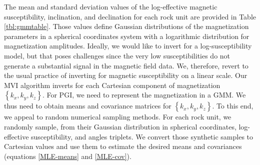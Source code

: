 \documentclass[paper, twocolumn]{geophysics} %
\begin{document}
The mean and standard deviation values of the log-effective magnetic susceptibility, inclination, and declination for each rock unit are provided in Table \ref{tbl:gmmtable}. Those values define Gaussian distributions of the magnetization parameters in a spherical coordinates system with a logarithmic distribution for magnetization amplitudes. Ideally, we would like to invert for a log-susceptibility model, but that poses challenges since the very low susceptibilities do not generate a substantial signal in the magnetic field data. We, therefore, revert to the usual practice of inverting for magnetic susceptibility on a linear scale. Our MVI algorithm inverts for each Cartesian component of magnetization $\left\{k_x,k_y,k_z\right\}$. For PGI, we need to represent the magnetization in a GMM. We thus need to obtain means and covariance matrices for $\left\{k_x,k_y,k_z\right\}$. To this end, we appeal to random numerical sampling methods. For each rock unit, we randomly sample, from their Gaussian distribution in spherical coordinates, log-effective susceptibility, and angles triplets. We convert those synthetic samples to Cartesian values and use them to estimate the desired means and covariances (equations \ref{MLE-means} and \ref{MLE-cov}).


\end{document}
